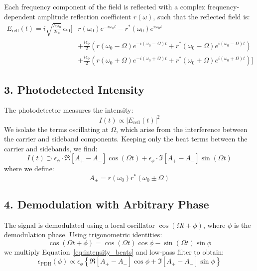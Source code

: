 Each frequency component of the field is reflected with a complex frequency-dependent amplitude reflection coefficient \( r(\omega) \), such that the reflected field is:
\begin{equation}
\begin{aligned}
    E_{\text{refl}}(t) = i \sqrt{\frac{\hbar \omega_0}{2 \varepsilon_0}} \, \alpha_0 \Big[
    & r(\omega_0) e^{-i\omega_0 t} - r^*(\omega_0) e^{i\omega_0 t} \\
    & + \frac{i \epsilon_\phi}{2} \left( r(\omega_0 - \Omega) e^{-i(\omega_0 - \Omega)t} + r^*(\omega_0 - \Omega) e^{i(\omega_0 - \Omega)t} \right) \\
    & + \frac{i \epsilon_\phi}{2} \left( r(\omega_0 + \Omega) e^{-i(\omega_0 + \Omega)t} + r^*(\omega_0 + \Omega) e^{i(\omega_0 + \Omega)t} \right)
    \Big]
\end{aligned}
\label{eq:refl_field}
\end{equation}

\subsection*{3. Photodetected Intensity}

The photodetector measures the intensity:
\[
I(t) \propto |E_{\text{refl}}(t)|^2
\]
We isolate the terms oscillating at \( \Omega \), which arise from the interference between the carrier and sideband components. Keeping only the beat terms between the carrier and sidebands, we find:
\begin{equation}
I(t) \supset \epsilon_\phi \cdot \Re\left[ A_+ - A_- \right] \cos(\Omega t)
+ \epsilon_\phi \cdot \Im\left[ A_+ - A_- \right] \sin(\Omega t)
\label{eq:intensity_beats}
\end{equation}
where we define:
\[
A_\pm = r(\omega_0) r^*(\omega_0 \pm \Omega)
\]

\subsection*{4. Demodulation with Arbitrary Phase}

The signal is demodulated using a local oscillator \( \cos(\Omega t + \phi) \), where \( \phi \) is the demodulation phase. Using trigonometric identities:
\[
\cos(\Omega t + \phi) = \cos(\Omega t)\cos\phi - \sin(\Omega t)\sin\phi
\]
we multiply Equation~\eqref{eq:intensity_beats} and low-pass filter to obtain:
\begin{equation}
\epsilon_{\text{PDH}}(\phi) \propto \epsilon_\phi \left\{
\Re[A_+ - A_-] \cos\phi + \Im[A_+ - A_-] \sin\phi
\right\}
\label{eq:error_signal_general}
\end{equation}

